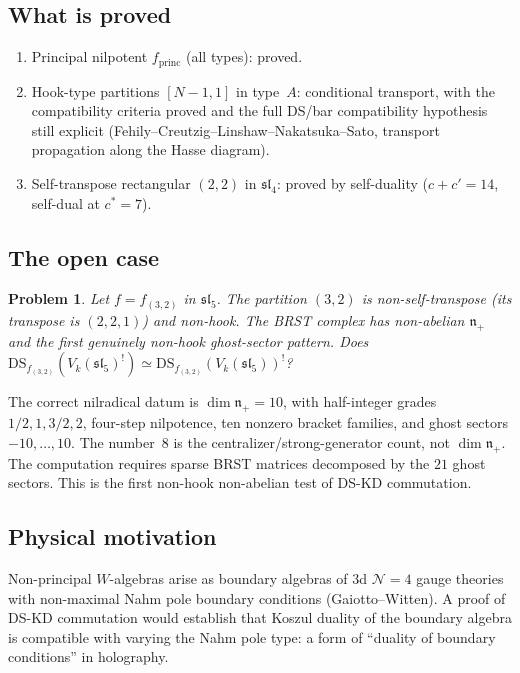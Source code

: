 \documentclass[11pt]{amsart}
\newcommand{\n}{\mathfrak{n}}
\newcommand{\fsl}{\mathfrak{sl}}
\theoremstyle{plain}
\newtheorem{problem}[theorem]{Problem}
\theoremstyle{definition}
\theoremstyle{remark}
\begin{document}
\subsection{What is proved}

\begin{enumerate}[label=(\roman*)]
\item Principal nilpotent $f_{\mathrm{princ}}$ (all types): proved.
\item Hook-type partitions $[N{-}1, 1]$ in type~$A$:
 conditional transport, with the compatibility criteria proved
 and the full DS/bar compatibility hypothesis still explicit
 (Fehily--Creutzig--Linshaw--Nakatsuka--Sato, transport
 propagation along the Hasse diagram).
\item Self-transpose rectangular $(2,2)$ in $\fsl_4$: proved by
 self-duality ($c + c' = 14$, self-dual at $c^* = 7$).
\end{enumerate}

\subsection{The open case}

\begin{problem}
Let $f = f_{(3,2)}$ in $\fsl_5$. The partition $(3,2)$ is
non-self-transpose (its transpose is $(2,2,1)$) and non-hook.
The BRST complex has non-abelian $\n_+$ and the first genuinely
non-hook ghost-sector pattern. Does
$\mathrm{DS}_{f_{(3,2)}}(V_k(\fsl_5)^!) \simeq
\mathrm{DS}_{f_{(3,2)}}(V_k(\fsl_5))^!$?
\end{problem}

The correct nilradical datum is
$\dim\n_+=10$, with half-integer grades $1/2,1,3/2,2$,
four-step nilpotence, ten nonzero bracket families, and ghost
sectors $-10,\ldots,10$.  The number~$8$ is the
centralizer/strong-generator count, not $\dim\n_+$.  The
computation requires sparse BRST matrices decomposed by the
$21$ ghost sectors.  This is the first non-hook non-abelian test
of DS-KD commutation.

\subsection{Physical motivation}

Non-principal $W$-algebras arise as boundary algebras of 3d
$\mathcal{N}=4$ gauge theories with non-maximal Nahm pole
boundary conditions (Gaiotto--Witten). A proof of DS-KD
commutation would establish that Koszul duality of the boundary algebra is
compatible with varying the Nahm pole type: a form of ``duality
of boundary conditions'' in holography.
\end{document}
